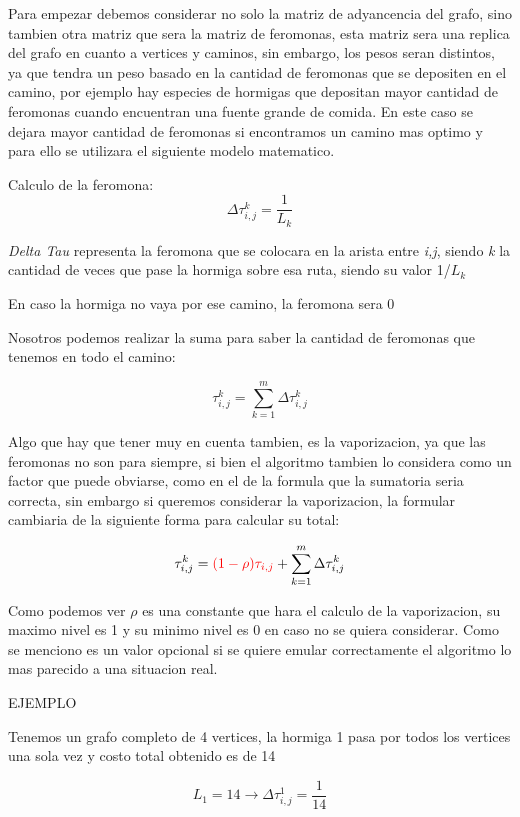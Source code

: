 \documentclass{article}
\begin{document}
Para empezar debemos considerar no solo la matriz de adyancencia del grafo, sino tambien otra matriz que sera la matriz de feromonas, esta matriz sera una replica del grafo en cuanto
a vertices y caminos, sin embargo, los pesos seran distintos, ya que tendra un peso basado en la cantidad de feromonas que se depositen en el camino, por ejemplo hay especies de hormigas
que depositan mayor cantidad de feromonas cuando encuentran una fuente grande de comida. En este caso se dejara mayor cantidad de feromonas si encontramos un camino mas optimo y para ello
se utilizara el siguiente modelo matematico.

Calculo de la feromona: $$\Delta\tau_{i,j}^k={  \frac{1}{L_k}}$$

\textit{Delta Tau} representa la feromona que se colocara en la arista entre \textit{i,j}, siendo \textit{k} la cantidad de veces que pase la hormiga sobre esa ruta, siendo su valor 1/$L_k$

En caso la hormiga no vaya por ese camino, la feromona sera 0

Nosotros podemos realizar la suma para saber la cantidad de feromonas que tenemos en todo el camino:

$$\tau_{i,j}^k=\sum_{k=1}^{m} \Delta\tau_{i,j}^k$$

Algo que hay que tener muy en cuenta tambien, es la vaporizacion, ya que las feromonas no son para siempre, si bien el algoritmo tambien lo considera como un factor que puede obviarse,
como en el de la formula que la sumatoria seria correcta, sin embargo si queremos considerar la vaporizacion, la formular cambiaria de la siguiente forma para calcular su total:

$$\tau_{i,j}^k=\textcolor{red}{(1-\rho)\tau_{i,j}}+\sum_{k=1}^{m} \Delta\tau_{i,j}^k$$

Como podemos ver \textit{$\rho$} es una constante que hara el calculo de la vaporizacion,
 su maximo nivel es 1 y su minimo nivel es 0 en caso no se quiera considerar. Como se menciono
es un valor opcional si se quiere emular correctamente el algoritmo lo mas parecido a una situacion real.


\vspace{25mm}

EJEMPLO

\vspace{5mm}

Tenemos un grafo completo de 4 vertices, la hormiga 1 pasa por todos los vertices una sola vez y costo total obtenido es de 14

$$L_1=14 \rightarrow \Delta\tau_{i,j}^1=\frac{1}{14}$$
\end{document}
